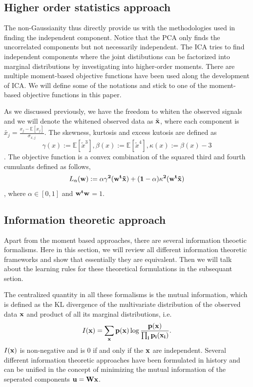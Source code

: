 \documentclass[aps,prl,preprint,superscriptaddress]{revtex4-2}
\begin{document}
\subsection{Higher order statistics approach}

The non-Gaussianity thus directly provide us with the methodologies used in finding the independent component. Notice that the PCA only finds the uncorrelated components but not necessarily independent. The ICA tries to find independent components where the joint distibutions can be factorized into marginal distributions by investigating into higher-order moments. There are multiple moment-based objective functions have been used along the development of ICA. We will define some of the notations and stick to one of the moment-based objective functions in this paper.  

As we discussed previously, we have the freedom to whiten the observed signals and we will denote the whitened observed data as $\tilde{\bf{x}}$, where each component is $\tilde{x_{j}} = \frac{x_{j}-\mathbb{E}[x_{j}]}{\sigma_{x,j}}$. The skewness, kurtosis and excess kutosis are defined as $$ \gamma(x) := \mathbb{E}[\tilde{x}^{3}], \beta(x) := \mathbb{E}[\tilde{x}^{4}], \kappa(x) := \beta(x)-3 $$.
The objective function is a convex combination of the squared third and fourth cumulants defined as follows,
\begin{equation}
L_{\alpha}(\bf{w}) := \alpha \gamma^{2}(\bf{w}^{t}\tilde{\bf{x}}) + (1-\alpha)\kappa^{2}(\bf{w}^{t}\tilde{\bf{x}})
\end{equation},
where $\alpha \in [0, 1]$ and $\bf{w}^{t}\bf{w}$$ = 1$.


\subsection{Information theoretic approach}

Apart from the moment based approaches, there are several information theoetic formalisms. Here in this section, we will review all different information theoretic frameworks and show that essentially they are equivalent. Then we will talk about the learning rules for these theoretical formulations in the subsequant setion. 

The centralized quantity in all these formalisms is the mutual information, which is defined as the KL divergence of the multivariate distribution of the observed data $\bf{x}$ and product of all its marginal distributions, i.e. 
\begin{equation}
I(\bf{x}) = \sum_{\bf{x}}p(\bf{x})\log\frac{p(\bf{x})}{\prod_{i}p_{i}(x_{i})}.
\end{equation} $I(\bf{x})$ is non-negative and is 0 if and only if the $\bf{x}$ are independent. Several different information theoretic approaches have been formulated in history and can be unified in the concept of minimizing the mutual information of the seperated components $\bf{u} = \bf{W}\bf{x}$. 
\end{document}
